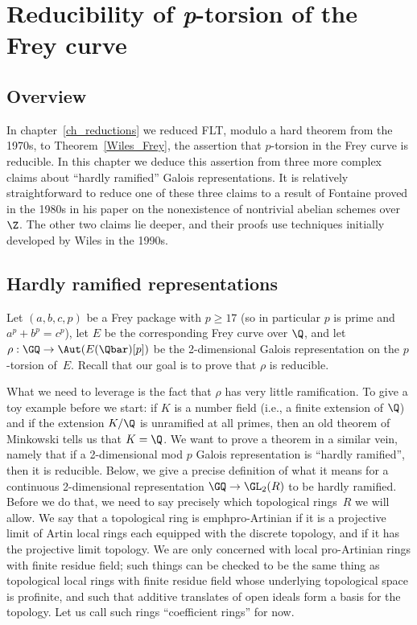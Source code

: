 \chapter{Reducibility of {\it p}-torsion of the Frey curve}\label{ch_freyreduction}

\section{Overview}

In chapter~\ref{ch_reductions} we reduced FLT, modulo a hard theorem from the 1970s,
to Theorem~\ref{Wiles_Frey}, the assertion that $p$-torsion in the Frey
curve is reducible. In this chapter we deduce this assertion from three more complex claims
about ``hardly ramified'' Galois representations. It is relatively straightforward
to reduce one of these three claims to a result of Fontaine proved in the 1980s in his
paper on the nonexistence of nontrivial abelian schemes over $\Z$. The other two
claims lie deeper, and their proofs use techniques initially developed by Wiles in
the 1990s.

\section{Hardly ramified representations}

Let $(a,b,c,p)$ be a Frey package with $p\geq17$ (so in particular $p$ is prime and
$a^p+b^p=c^p$),
let $E$ be the corresponding Frey curve over $\Q$, and let $\rho:\GQ\to\Aut(E(\Qbar)[p])$
be the 2-dimensional Galois representation on the $p$-torsion of~$E$. Recall that our goal
is to prove that $\rho$ is reducible.

What we need to leverage is the fact that $\rho$ has very little ramification. To give
a toy example before we start: if $K$ is a number field (i.e., a finite extension of $\Q$)
and if the extension $K/\Q$ is unramified at all primes, then an old theorem of
Minkowski tells us that $K=\Q$. We want to prove a theorem in a similar vein, namely
that if a 2-dimensional mod $p$ Galois representation is ``hardly ramified'', then it is reducible.
Below, we give a precise
definition of what it means for a continuous 2-dimensional representation $\GQ\to\GL_2(R)$
to be hardly ramified. Before we do that, we need to say precisely which topological rings~$R$
we will allow. We say that a topological ring is emph{pro-Artinian} if it is a projective
limit of Artin local rings each equipped with the discrete topology, and if it has the
projective limit topology. We are only concerned with local pro-Artinian rings with finite
residue field; such things can be checked to be the same thing as topological
local rings with finite residue field whose underlying topological space is profinite,
and such that additive translates of open ideals form a basis for the topology.
Let us call such rings ``coefficient rings'' for now.

